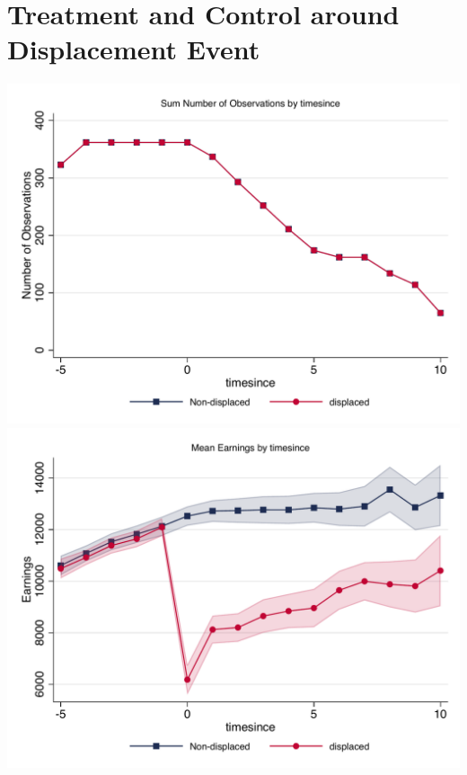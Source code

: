 \documentclass{article}
\begin{document}
\section{Treatment and Control around Displacement Event}
\includegraphics[width = .9\textwidth]{Disp_event_raw/counts_by_timesince.pdf} \\ 
\includegraphics[width = .9\textwidth]{Disp_event_raw/logearn_by_timesince.pdf} \\ 
\end{document}
